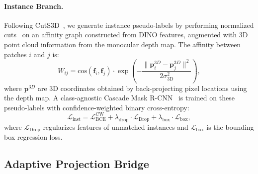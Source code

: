 \documentclass{article}
\newcommand{\linst}{\mathcal{L}_{\text{inst}}}
\begin{document}
\paragraph{Instance Branch.}
Following CutS3D~\cite{sick2025cuts3d}, we generate instance pseudo-labels by performing normalized cuts~\cite{shi2000ncut} on an affinity graph constructed from DINO features, augmented with 3D point cloud information from the monocular depth map. The affinity between patches $i$ and $j$ is:
\begin{equation}
W_{ij} = \text{cos}(\mathbf{f}_i, \mathbf{f}_j) \cdot \exp\!\left(-\frac{\|\mathbf{p}_i^{3D} - \mathbf{p}_j^{3D}\|^2}{2\sigma_{\text{3D}}^2}\right),
\end{equation}
where $\mathbf{p}^{3D}$ are 3D coordinates obtained by back-projecting pixel locations using the depth map. A class-agnostic Cascade Mask R-CNN~\cite{cai2019cascade} is trained on these pseudo-labels with confidence-weighted binary cross-entropy:
\begin{equation}
\linst = \mathcal{L}_{\text{BCE}}^{\text{CW}} + \lambda_{\text{drop}} \cdot \mathcal{L}_{\text{Drop}} + \lambda_{\text{box}} \cdot \mathcal{L}_{\text{box}},
\label{eq:instance_loss}
\end{equation}
where $\mathcal{L}_{\text{Drop}}$ regularizes features of unmatched instances and $\mathcal{L}_{\text{box}}$ is the bounding box regression loss.


\subsection{Adaptive Projection Bridge}
\label{sec:bridge}
\end{document}
